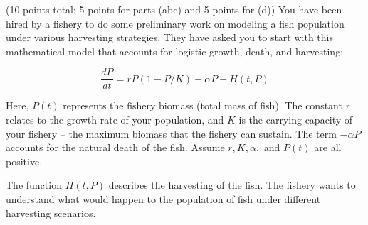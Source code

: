 \documentclass[11pt,letterpaper,boxed]{hmcpset}
\begin{document}

\pagebreak


\begin{problem}[3]
(10 points total: 5 points for parts (abc) and 5 points for (d)) You have been hired by a fishery to do some preliminary work on modeling a fish population under various harvesting strategies. They have asked you to start with this mathematical model that accounts for logistic growth, death, and harvesting:

\[\frac{dP}{dt} =rP(1-P/K)-\alpha P-H(t,P)\]

Here, $P(t)$ represents the fishery biomass (total mass of fish). The constant $r$ relates to the growth rate of your population, and $K$ is the carrying capacity of your fishery -- the maximum biomass that the fishery can sustain. The term $-\alpha P$ accounts for the natural death of the fish. Assume $r, K, \alpha,$ and $P(t)$ are all positive.

The function $H(t,P)$ describes the harvesting of the fish. The fishery wants to understand what would happen to the population of fish under different harvesting scenarios.


\end{problem}
\end{document}
